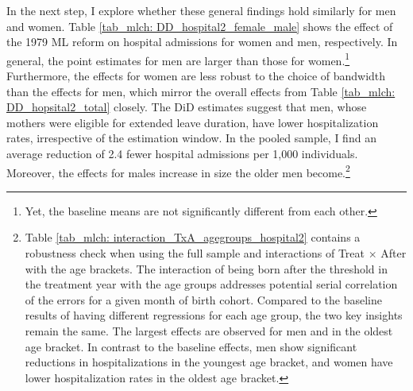 In the next step, I explore whether these general findings hold similarly for men and women. Table \ref{tab_mlch: DD_hospital2_female_male} shows the effect of the 1979 ML reform on hospital admissions for women and men, respectively. In general, the point estimates for men are larger than those for women.\footnote{Yet, the baseline means are not significantly different from each other.} Furthermore, the effects for women are less robust to the choice of bandwidth than the effects for men, which mirror the overall effects from Table \ref{tab_mlch: DD_hopsital2_total} closely. The DiD estimates suggest that men, whose mothers were eligible for extended leave duration, have lower hospitalization rates, irrespective of the estimation window. In the pooled sample, I find an average reduction of 2.4 fewer hospital admissions per 1,000 individuals. Moreover, the effects for males increase in size the older men become.\footnote{Table \ref{tab_mlch: interaction_TxA_agegroups_hospital2} contains a robustness check when using the full sample and interactions of Treat $\times$ After with the age brackets. The interaction of being born after the threshold in the treatment year with the age groups addresses potential serial correlation of the errors for a given month of birth cohort. Compared to the baseline results of having different regressions for each age group, the two key insights remain the same. The largest effects are observed for men and in the oldest age bracket. In contrast to the baseline effects, men show significant reductions in hospitalizations in the youngest age bracket, and women have lower hospitalization rates in the oldest age bracket.} 



